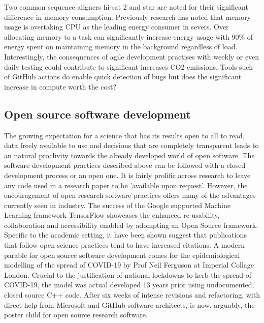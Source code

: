 \documentclass{SBCbookchapter}
\begin{document}
Two common sequence aligners hi-sat 2 and star are noted for their significant difference in memory consumption.
Previously research has noted that memory usage is overtaking CPU as the leading energy consumer in severs.
Over allocating memory to a task can significantly increase energy usage with 90\% of energy spent on maintaining memory in the background regardless of load.
Interestingly, the consequences of agile development practises with weekly or even daily testing could contribute to significant increases CO2 emissions.
Tools such of GitHub actions do enable quick detection of bugs but does the significant increase in compute worth the cost?



\subsection{Open source software development}

The growing expectation for a science that has its results open to all to read, data freely available to use and decisions that are completely transparent leads to an natural proclivity towards the already developed world of open software. The software development practices described above can be followed with a closed development process or an open one. It is fairly prolific across research to leave any code used in a research paper to be 'available upon request'. However, the encouragement of open research software practices offers many of the advantages currently seen in industry. The success of the Google supported Machine Learning framework TensorFlow showcases the enhanced re-usability, collaboration and accessibility enabled by adompting an Open Source framework. Specific to the academic setting,  it have been shown suggest that publications that follow open science practices tend to have increased citations. A modern parable for open source software development comes for the epidemiological modelling of the spread of COVID-19 by Prof Neil Ferguson at Imperial Collage London. Crucial to the justification of national lockdowns to kerb the spread of COVID-19, the model was actual developed 13 years prior using undocumented, closed source C++ code. After six weeks of intense revisions and refactoring, with direct help from Microsoft and GitHub software architects,  is now, arguably, the poster child for open source research software.
\end{document}
